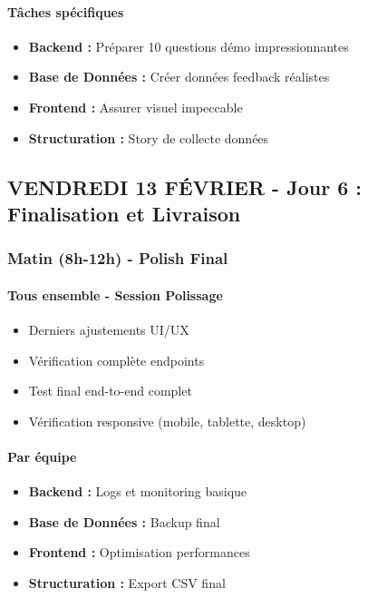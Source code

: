 \documentclass[11pt,a4paper]{article}
\begin{document}
\paragraph{Tâches spécifiques}
\begin{itemize}
    \item[$\square$] \textbf{Backend :} Préparer 10 questions démo impressionnantes
    \item[$\square$] \textbf{Base de Données :} Créer données feedback réalistes
    \item[$\square$] \textbf{Frontend :} Assurer visuel impeccable
    \item[$\square$] \textbf{Structuration :} Story de collecte données
\end{itemize}

\clearpage

\subsection{VENDREDI 13 FÉVRIER - Jour 6 : Finalisation et Livraison}

\subsubsection{Matin (8h-12h) - Polish Final}

\paragraph{Tous ensemble - Session Polissage}
\begin{itemize}
    \item[$\square$] Derniers ajustements UI/UX
    \item[$\square$] Vérification complète endpoints
    \item[$\square$] Test final end-to-end complet
    \item[$\square$] Vérification responsive (mobile, tablette, desktop)
\end{itemize}

\paragraph{Par équipe}
\begin{itemize}
    \item[$\square$] \textbf{Backend :} Logs et monitoring basique
    \item[$\square$] \textbf{Base de Données :} Backup final
    \item[$\square$] \textbf{Frontend :} Optimisation performances
    \item[$\square$] \textbf{Structuration :} Export CSV final
\end{itemize}
\end{document}
